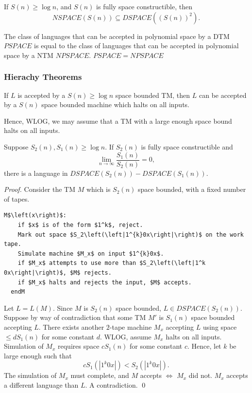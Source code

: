 \begin{theorem}
  If $S(n)\ge \log{n}$, and $S\left( n \right) $ is fully space constructible, then
  \[NSPACE\left( S\left( n \right)  \right) \subseteq DSPACE\left( {\left( S\left( n \right)  \right) }^{2} \right).\] 
\end{theorem}

\begin{theorem}
  The class of languages that can be accepted in polynomial space by a DTM
  $PSPACE$ is equal to the class of languages that can be accepted in
  polynomial space by a NTM $NPSPACE$. $PSPACE=NPSPACE$
\end{theorem}

\subsubsection{Hierachy Theorems}
\begin{theorem}
  If $L$ is accepted by a $S(n)\ge \log{n}$ space bounded TM, then $L$ can be
  accepted by a $S(n)$ space bounded machine which halts on all inputs.
\end{theorem}
Hence, WLOG, we may assume that a TM with a large enough space bound halts on
all inputs.
\begin{theorem}
  Suppose $S_2(n),S_1(n)\ge \log{n}$. If $S_2(n)$ is fully space constructible and
  \[\lim_{n \to \infty} \frac{S_1(n)}{S_2(n)}=0,\] 
  there is a language in $DSPACE\left( S_2\left( n \right)  \right)
  -DSPACE\left( S_1\left( n \right)  \right) $.
\end{theorem}
\begin{proof}
  Consider the TM $M$ which is $S_2\left( n \right) $ space bounded, with a
  fixed number of tapes.
  \begin{lstlisting}[mathescape]
  M$\left(x\right)$:
    if $x$ is of the form $1^k$, reject.
    Mark out space $S_2\left(\left|1^{k}0x\right|\right)$ on the work tape.
    Simulate machine $M_x$ on input $1^{k}0x$.
    if $M_x$ attempts to use more than $S_2\left(\left|1^k 0x\right|\right)$, $M$ rejects.
    if $M_x$ halts and rejects the input, $M$ accepts.
  endM
  \end{lstlisting}
  Let $L=L(M)$. Since $M$ is $S_2(n)$ space bounded, $L\in DSPACE\left(
  S_2\left( n \right)  \right) $.\\

  Suppose by way of contradiction that some TM $M'$ is $S_1(n)$ space bounded
  accepting $L$. There exists another $2$-tape machine $M_x$ accepting $L$
  using space $\le dS_1(n)$ for some constant $d$. WLOG, assume $M_x$ halts on
  all inputs.\\

  Simulation of $M_x$ requires space $cS_1(n)$ for some constant $c$. Hence, let
  $k$ be large enough such that
  \[cS_1\left( \left| 1^{k}0x \right|  \right) <S_2\left( \left| 1^{k}0x
  \right|  \right).\]
  The simulation of $M_x$ must complete, and $M$ accepts $\iff$ $M_x$ did not.
  $M_x$ accepts a different language than $L$. A contradiction. \qed
\end{proof}

